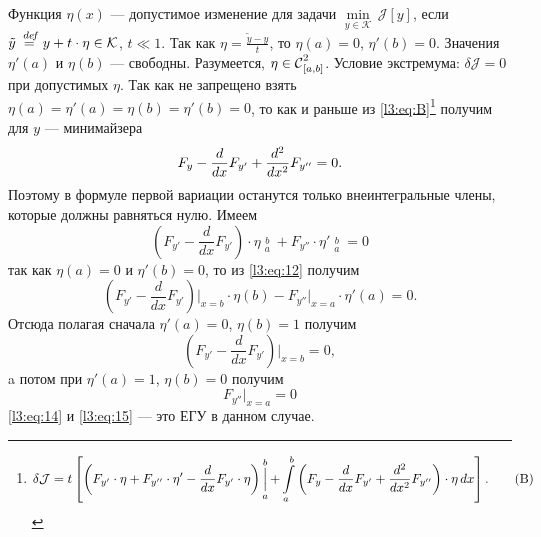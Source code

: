 \documentclass[12pt,a4paper,openany,fleqn]{book}
\newcommand {\defeq}{\stackrel{\hspace{0.09 cm}de\!f}{=}}
\newcommand {\eqdef}{\defeq}
\newcommand{\Cf}{\ensuremath{\mathcal{C}}}
\newcommand{\J}{\ensuremath{\mathcal{J}}}
\newcommand{\mc}[1]{\ensuremath{\mathcal{#1}}}
\newcommand{\Cfn}[2][]{\ensuremath{\Cf{\mathstrut}^{#2}_{#1}}}
\newcommand{\der}[2]{\ensuremath{\frac{d#1}{d#2}}}
\newcommand{\dder}[2]{\ensuremath{\frac{d^2#1}{d#2^2}}}
\newcommand{\K}{\mc{K}}
\theoremstyle{definition}
\begin{document}
Функция $\eta(x)$ --- допустимое изменение для задачи $\min\limits_{y\in\K}\,\J[y]$, если $\tilde{y}\eqdef y+t\cdot\eta\in\K$, $t\ll1$. Так как $\eta=\frac{\tilde{y}-y}{t}$, то $\eta(a)=0$, $\eta'(b)=0$. Значения $\eta'(a)$ и $\eta(b)$ --- свободны. Разумеется, $\eta\in\Cfn[{[a,b]}]{2}$. Условие экстремума: $\delta\J=0$ при допустимых $\eta$. Так как не запрещено взять $\eta(a)=\eta'(a)=\eta(b)=\eta'(b)=0$, то как и раньше из \eqref{l3:eq:B}\footnote{\begin{equation*}
	\hfill\delta\J=t\left[\left(F_{y'}\cdot\eta+F_{y''}\cdot\eta'-\der{}{x}F_{y'}\cdot\eta\right)\mathop{\Big|}\limits_a^b+\int\limits_a^b\left(F_{y}-\der{}{x}F_{y'}+\dder{}{x}F_{y''}\right)\cdot\eta\,dx\right].\hfill\tag{B}
\end{equation*}} получим для $y$ --- минимайзера
\begin{equation*}
	\hfill F_y-\der{}{x}F_{y'}+\dder{}{x}F_{y''}=0.\hfill
\end{equation*}
Поэтому в формуле первой вариации останутся только внеинтегральные члены, которые должны равняться нулю. Имеем
\begin{equation}
	\label{l3:eq:12}
	\left(F_{y'}-\der{}{x}F_{y'}\right)\cdot\eta\mathop{\Big|}\limits_a^b+F_{y''}\cdot\eta'\mathop{\Big|}\limits_a^b=0
\end{equation}
так как $\eta(a)=0$ и $\eta'(b)=0$, то из \eqref{l3:eq:12} получим
\begin{equation}
	\label{l3:eq:13}
	\left(F_{y'}-\der{}{x}F_{y'}\right)\Big|_{x=b}\cdot\eta(b)-F_{y''}\Big|_{x=a}\cdot\eta'(a)=0.
\end{equation}
Отсюда полагая сначала $\eta'(a)=0$, $\eta(b)=1$ получим
\begin{equation}
	\label{l3:eq:14}
	\left(F_{y'}-\der{}{x}F_{y'}\right)\Big|_{x=b}=0,
\end{equation}
a потом при $\eta'(a)=1$, $\eta(b)=0$ получим 
\begin{equation}
	\label{l3:eq:15}
	F_{y''}\Big|_{x=a}=0
\end{equation}
\eqref{l3:eq:14} и \eqref{l3:eq:15} --- это ЕГУ в данном случае.
\end{document}
